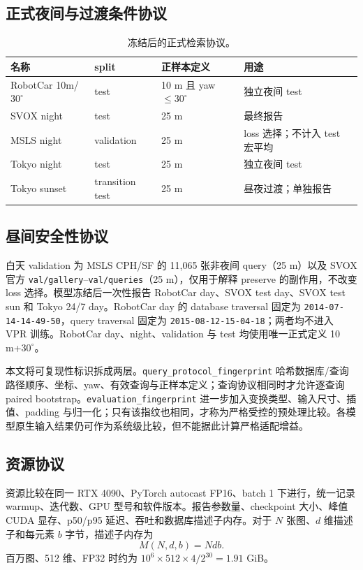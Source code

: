 \documentclass[UTF8,a4paper,11pt]{ctexart}
\begin{document}
\subsection{正式夜间与过渡条件协议}
\begin{table}[htbp]
\centering
\caption{冻结后的正式检索协议。}
\label{tab:protocols}
\begin{tabular}{llll}
\toprule
名称 & split & 正样本定义 & 用途\\
\midrule
RobotCar 10m/$30^\circ$ & test & 10 m 且 yaw $\le30^\circ$ & 独立夜间 test\\
SVOX night & test & 25 m & 最终报告\\
MSLS night & validation & 25 m & loss 选择；不计入 test 宏平均\\
Tokyo night & test & 25 m & 独立夜间 test\\
Tokyo sunset & transition test & 25 m & 昼夜过渡；单独报告\\
\bottomrule
\end{tabular}
\end{table}

\subsection{昼间安全性协议}
白天 validation 为 MSLS CPH/SF 的 11,065 张非夜间 query（25 m）以及 SVOX 官方 \texttt{val/gallery}--\texttt{val/queries}（25 m），仅用于解释 preserve 的副作用，不改变 loss 选择。模型冻结后一次性报告 RobotCar day、SVOX test day、SVOX test sun 和 Tokyo 24/7 day。RobotCar day 的 database traversal 固定为 \texttt{2014-07-14-14-49-50}，query traversal 固定为 \texttt{2015-08-12-15-04-18}；两者均不进入 VPR 训练。RobotCar day、night、validation 与 test 均使用唯一正式定义 10 m+$30^\circ$。

本文将可复现性标识拆成两层。\texttt{query\_protocol\_fingerprint} 哈希数据库/查询路径顺序、坐标、yaw、有效查询与正样本定义；查询协议相同时才允许逐查询 paired bootstrap。\texttt{evaluation\_fingerprint} 进一步加入变换类型、输入尺寸、插值、padding 与归一化；只有该指纹也相同，才称为严格受控的预处理比较。各模型原生输入结果仍可作为系统级比较，但不能据此计算严格适配增益。

\subsection{资源协议}
资源比较在同一 RTX 4090、PyTorch autocast FP16、batch 1 下进行，统一记录 warmup、迭代数、GPU 型号和软件版本。报告参数量、checkpoint 大小、峰值 CUDA 显存、p50/p95 延迟、吞吐和数据库描述子内存。对于 $N$ 张图、$d$ 维描述子和每元素 $b$ 字节，描述子内存为
\[
 M(N,d,b)=Ndb.
\]
百万图、512 维、FP32 时约为 $10^6\times512\times4/2^{30}=1.91$ GiB。
\end{document}
